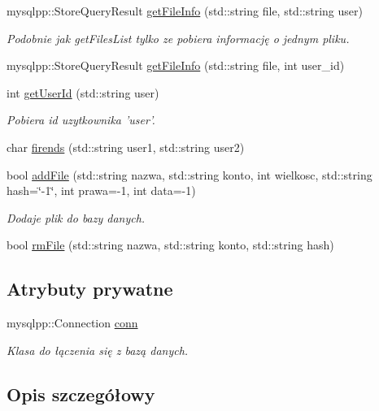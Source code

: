 \begin{CompactItemize}
mysqlpp::StoreQueryResult \hyperlink{a00001_e4a033a65cb585aa91c15fd8b8fde764}{getFileInfo} (std::string file, std::string user)
\begin{CompactList}\small\item\em Podobnie jak getFilesList tylko ze pobiera informację o jednym pliku. \item\end{CompactList}\item 
mysqlpp::StoreQueryResult \hyperlink{a00001_1d1cfca062ab3117b2b97281df012823}{getFileInfo} (std::string file, int user\_\-id)
\item 
int \hyperlink{a00001_65054f08c8fd7c600f6c2fe2c7f61a43}{getUserId} (std::string user)
\begin{CompactList}\small\item\em Pobiera id uzytkownika 'user'. \item\end{CompactList}\item 
char \hyperlink{a00001_71ac41633bfb8e4b854aaa8281aac24c}{firends} (std::string user1, std::string user2)
\item 
bool \hyperlink{a00001_abbda65be49dfb28b1a578d0383599fa}{addFile} (std::string nazwa, std::string konto, int wielkosc, std::string hash=\char`\"{}-1\char`\"{}, int prawa=-1, int data=-1)
\begin{CompactList}\small\item\em Dodaje plik do bazy danych. \item\end{CompactList}\item 
bool \hyperlink{a00001_7161c573401166cc5f7d98ae6f335b44}{rmFile} (std::string nazwa, std::string konto, std::string hash)
\end{CompactItemize}
\subsection*{Atrybuty prywatne}
\begin{CompactItemize}
\item 
mysqlpp::Connection \hyperlink{a00001_f966364deec225fdf2d2d22550c71c88}{conn}
\begin{CompactList}\small\item\em Klasa do łączenia się z bazą danych. \item\end{CompactList}\end{CompactItemize}


\subsection{Opis szczegółowy}


